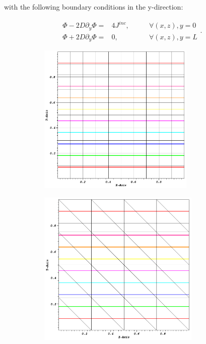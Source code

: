 \noindent with the following boundary conditions in the y-direction:

\begin{equation}
\label{eq::mms_lin_bcs}
\begin{aligned}
\Phi - 2D \partial_y \Phi = & 4 J^{inc}, \qquad & \forall (x,z),y=0 \\
\Phi + 2D \partial_y \Phi = & 0, \qquad & \forall (x,z),y=L
\end{aligned}.
\end{equation}

\begin{figure}
\centering
	\begin{subfigure}[b]{0.5\textwidth}
		\centering
		\includegraphics[width=0.82\textwidth]{figures/sec_DSA/SIP_cart_lin_contour.png}
		\caption{}
	\end{subfigure}
	\vfill
	\begin{subfigure}[b]{0.45\textwidth}
		\centering
		\includegraphics[width=0.85\textwidth]{figures/sec_DSA/SIP_tri_lin_contour.png}

\end{subfigure}
\end{figure}

